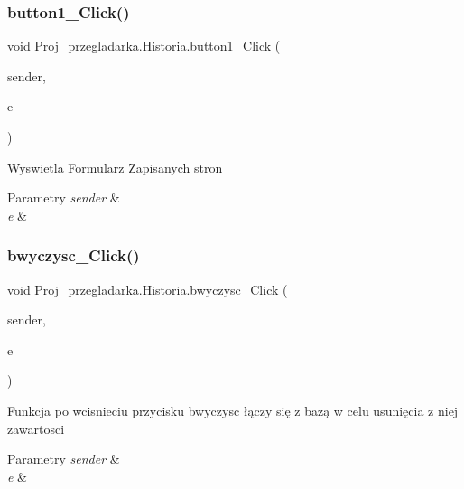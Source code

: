 \subsubsection{\texorpdfstring{button1\_Click()}{button1\_Click()}}
{\footnotesize\ttfamily void Proj\+\_\+przegladarka.\+Historia.\+button1\+\_\+\+Click (\begin{DoxyParamCaption}\item[{object}]{sender,  }\item[{Event\+Args}]{e }\end{DoxyParamCaption})\hspace{0.3cm}{\ttfamily [private]}}



Wyswietla Formularz Zapisanych stron 


\begin{DoxyParams}{Parametry}
{\em sender} & \\
\hline
{\em e} & \\
\hline
\end{DoxyParams}
\mbox{\label{class_proj__przegladarka_1_1_historia_a6fc44cb9852c2c90a66d3bb424272fec}} 
\subsubsection{\texorpdfstring{bwyczysc\_Click()}{bwyczysc\_Click()}}
{\footnotesize\ttfamily void Proj\+\_\+przegladarka.\+Historia.\+bwyczysc\+\_\+\+Click (\begin{DoxyParamCaption}\item[{object}]{sender,  }\item[{Event\+Args}]{e }\end{DoxyParamCaption})\hspace{0.3cm}{\ttfamily [private]}}



Funkcja po wcisnieciu przycisku bwyczysc łączy się z bazą w celu usunięcia z niej zawartosci 


\begin{DoxyParams}{Parametry}
{\em sender} & \\
\hline
{\em e} & \\
\hline
\end{DoxyParams}
\mbox{\label{class_proj__przegladarka_1_1_historia_a53cfdbbd281c2f39d9d81533c7d8555c}} 
